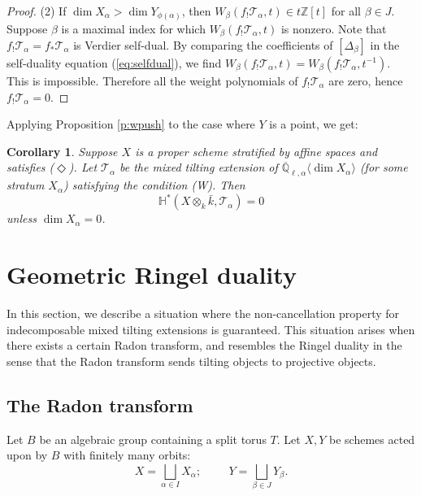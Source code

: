\documentclass{amsart}
\theoremstyle{plain}
\newtheorem{cor}[subsubsection]{Corollary}
\theoremstyle{definition}
\theoremstyle{remark}
\numberwithin{equation}{subsection}
\begin{document}
\begin{proof}
(2) If $\dim X_\alpha>\dim Y_{\phi(\alpha)}$, then $W_{\beta}(f_!{\mathcal{T}}_\alpha,t)\in t{\mathbb{Z}}[t]$ for all $\beta\in J$. Suppose $\beta$ is a maximal index for which $W_{\beta}(f_!{\mathcal{T}}_\alpha,t)$ is nonzero. Note that $f_!{\mathcal{T}}_\alpha=f_*{\mathcal{T}}_\alpha$ is Verdier self-dual. By comparing the coefficients of $[\Delta_\beta]$ in the self-duality equation (\ref{eq:selfdual}), we find $W_{\beta}(f_!{\mathcal{T}}_\alpha,t)=W_{\beta}(f_!{\mathcal{T}}_\alpha,t^{-1})$. This is impossible. Therefore all the weight polynomials of $f_!{\mathcal{T}}_\alpha$ are zero, hence $f_!{\mathcal{T}}_\alpha=0$.
\end{proof}

Applying Proposition \ref{p:wpush} to the case where $Y$ is a point, we get:
\begin{cor}
Suppose $X$ is a proper scheme stratified by affine spaces and satisfies ($\Diamond$). Let ${\mathcal{T}}_\alpha$ be the mixed tilting extension of ${\overline{\mathbb{Q}}_{\ell,\alpha}{\langle{{\dim X_\alpha}}\rangle}}$ (for some stratum $X_\alpha$) satisfying the condition (W). Then
\begin{equation*}
{\mathbb{H}}^*({{X}\otimes_k\bar{k}},{\mathcal{T}}_\alpha)=0
\end{equation*}
unless $\dim X_\alpha=0$.
\end{cor}

\section{Geometric Ringel duality}\label{s:geom}
In this section, we describe a situation where the non-cancellation property for indecomposable mixed tilting extensions is guaranteed. This situation arises when there exists a certain Radon transform, and resembles the Ringel duality in the sense that the Radon transform sends tilting objects to projective objects.

\subsection{The Radon transform}\label{ss:radon}
Let $B$ be an algebraic group containing a split torus $T$. Let $X,Y$ be schemes acted upon by $B$ with finitely many orbits:
\begin{equation*}
X=\bigsqcup_{\alpha\in I}X_\alpha;\hspace{1cm}Y=\bigsqcup_{\beta\in J}Y_{\beta}.
\end{equation*}
\end{document}
